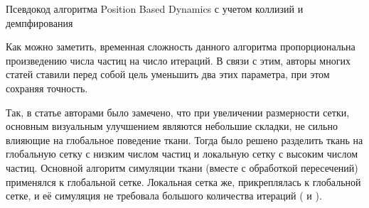 	\begin{algorithm} %
		\nonl{}
		\caption{Псевдокод алгоритма Position Based Dynamics с учетом коллизий и демпфирования}\label{alg:PositionBasedDynamics2}
	\end{algorithm}
	\FloatBarrier
	
	Как можно заметить, временная сложность данного алгоритма пропорциональна произведению числа частиц на число итераций. В связи с этим, авторы многих статей ставили перед собой цель уменьшить два этих параметра, при этом сохраняя точность.
	
	Так, в статье \cite{muller2010wrinkle} авторами было замечено, что при увеличении размерности сетки, основным визуальным улучшением являются небольшие складки, не сильно влияющие на глобальное поведение ткани. Тогда было решено разделить ткань на глобальную сетку с низким числом частиц и локальную сетку с высоким числом частиц. Основной алгоритм симуляции ткани (вместе с обработкой пересечений) применялся к глобальной сетке. Локальная сетка же, прикреплялась к глобальной сетке, и её симуляция не требовала большого количества итераций ( и ).

